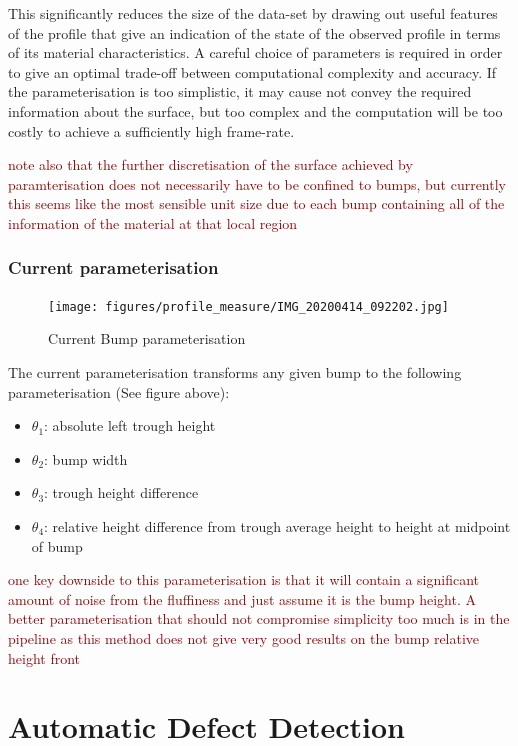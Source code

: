 \documentclass[12pt]{report}
\newcommand{\tcr}[1]{\textcolor{darkRed}{#1}}
\begin{document}
        This significantly reduces the size of the data-set by drawing out useful features of the profile that give an indication of the state of the observed profile in terms of its material characteristics. A careful choice of parameters is required in order to give an optimal trade-off between computational complexity and accuracy. If the parameterisation is too simplistic, it may cause not convey the required information about the surface, but too complex and the computation will be too costly to achieve a sufficiently high frame-rate.
        
        \tcr{note also that the further discretisation of the surface achieved by paramterisation does not necessarily have to be confined to bumps, but currently this seems like the most sensible unit size due to each bump containing all of the information of the material at that local region}
        
        \subsection{Current parameterisation}
            \begin{figure}
                \centering
                \texttt{[image: figures/profile\_measure/IMG\_20200414\_092202.jpg]}
                \caption{Current Bump parameterisation}
            \end{figure}
            The current parameterisation transforms any given bump to the following parameterisation (See figure above):
            \begin{itemize}
                \item $\theta_1$: absolute left trough height
                \item $\theta_2$: bump width
                \item $\theta_3$: trough height difference
                \item $\theta_4$: relative height difference from trough average height to height at midpoint of bump 
            \end{itemize}
            \tcr{one key downside to this parameterisation is that it will contain a significant amount of noise from the fluffiness and just assume it is the bump height. A better parameterisation that should not compromise simplicity too much is in the pipeline as this method does not give very good results on the bump relative height front}

\chapter{Automatic Defect Detection}
\end{document}
